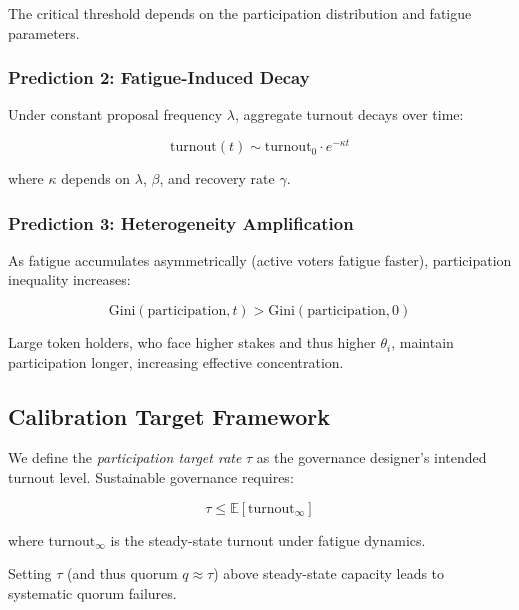 The critical threshold depends on the participation distribution and fatigue parameters.

\subsubsection{Prediction 2: Fatigue-Induced Decay}

Under constant proposal frequency $\lambda$, aggregate turnout decays over time:

\begin{equation}
\text{turnout}(t) \sim \text{turnout}_0 \cdot e^{-\kappa t}
\end{equation}

where $\kappa$ depends on $\lambda$, $\beta$, and recovery rate $\gamma$.

\subsubsection{Prediction 3: Heterogeneity Amplification}

As fatigue accumulates asymmetrically (active voters fatigue faster), participation inequality increases:

\begin{equation}
\text{Gini}(\text{participation}, t) > \text{Gini}(\text{participation}, 0)
\end{equation}

Large token holders, who face higher stakes and thus higher $\theta_i$, maintain participation longer, increasing effective concentration.

\subsection{Calibration Target Framework}

We define the \textit{participation target rate} $\tau$ as the governance designer's intended turnout level. Sustainable governance requires:

\begin{equation}
\tau \leq \mathbb{E}[\text{turnout}_{\infty}]
\end{equation}

where $\text{turnout}_{\infty}$ is the steady-state turnout under fatigue dynamics.

Setting $\tau$ (and thus quorum $q \approx \tau$) above steady-state capacity leads to systematic quorum failures.
